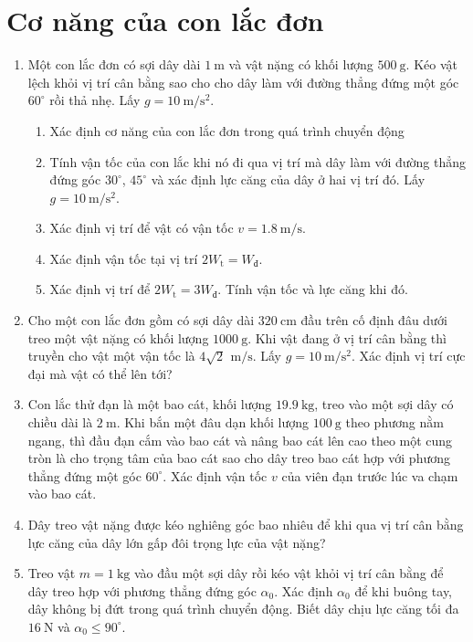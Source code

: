 \section{Cơ năng của con lắc đơn}
\begin{enumerate}
	\item %
	Một con lắc đơn có sợi dây dài $\SI{1}{\meter}$ và vật nặng có khối lượng $\SI{500}{\gram}$. Kéo vật lệch khỏi vị trí cân bằng sao cho cho dây làm với đường thẳng đứng một góc $60^\circ$ rồi thả nhẹ. Lấy $g= \SI{10}{\meter/\second^2}$.
	\begin{enumerate}[label=\alph*)]
		\item Xác định cơ năng của con lắc đơn trong quá trình chuyển động
		\item Tính vận tốc của con lắc khi nó đi qua vị trí mà dây làm với đường thẳng đứng góc $30^\circ$, $45^\circ$ và xác định lực căng của dây ở hai vị trí đó. Lấy $g= \SI{10}{\meter/\second^2}$.
		\item Xác định vị trí để vật có vận tốc $v=\SI{1,8}{\meter/\second}$.
		\item Xác định vận tốc tại vị trí $2W_\text{t}=W_\text{đ}$.
		\item Xác định vị trí để $2W_\text{t}=3W_\text{đ}$. Tính vận tốc và lực căng khi đó.
	\end{enumerate}
	\item %
	Cho một con lắc đơn gồm có sợi dây dài $\SI{320}{\centi\meter}$ đầu trên cố định đâu dưới treo một vật nặng có khối lượng $\SI{1000}{\gram}$. Khi vật đang ở vị trí cân bằng thì truyền cho vật một vận tốc là $4\sqrt{2}\,\SI{}{\meter/\second}$. Lấy $g= \SI{10}{\meter/\second^2}$. Xác định vị trí cực đại mà vật có thể lên tới?
	\item %
	Con lắc thử đạn là một bao cát, khối lượng $\SI{19,9}{\kilogram}$, treo vào một sợi dây có chiều dài là $\SI{2}{\meter}$. Khi bắn một đâu dạn khối lượng $\SI{100}{\gram}$ theo phương nằm ngang, thì đầu đạn cắm vào bao cát và nâng bao cát lên cao theo một cung tròn là cho trọng tâm của bao cát sao cho dây treo bao cát hợp với phương thẳng đứng một góc $60^\circ$. Xác định vận tốc $v$ của viên đạn trước lúc va chạm vào bao cát.
	\item %
	Dây treo vật nặng được kéo nghiêng góc bao nhiêu để khi qua vị trí cân bằng lực căng của dây lớn gấp đôi trọng lực của vật nặng?
	\item %
	Treo vật $m=\SI{1}{\kilogram}$ vào đầu một sợi dây rồi kéo vật khỏi vị trí cân bằng để dây treo hợp với phương thẳng đứng góc $\alpha_0$. Xác định $\alpha_0$ để khi buông tay, dây không bị đứt trong quá trình chuyển động. Biết dây chịu lực căng tối đa $\SI{16}{\newton}$ và $\alpha_0\leq90^\circ$.
\end{enumerate}

